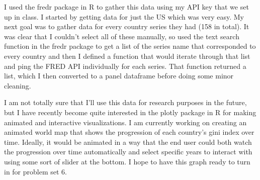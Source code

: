 \documentclass{article}
\begin{document}
I used the fredr package in R to gather this data using my API key that we set up in class. I started by getting data for just the US which was very easy. My next goal was to gather data for every country series they had (158 in total). It was clear that I couldn't select all of these manually, so used the text search function in the fredr package to get a list of the series name that corresponded to every country and then I defined a function that would iterate through that list and ping the FRED API individually for each series. That function returned a list, which I then converted to a panel dataframe before doing some minor cleaning. 

I am not totally sure that I'll use this data for research purposes in the future, but I have recently become quite interested in the plotly package in R for making animated and interactive visualizations. I am currently working on creating an animated world map that shows the progression of each country's gini index over time. Ideally, it would be animated in a way that the end user could both watch the progression over time automatically and select specific years to interact with using some sort of slider at the bottom. I hope to have this graph ready to turn in for problem set 6. 
\end{document}
